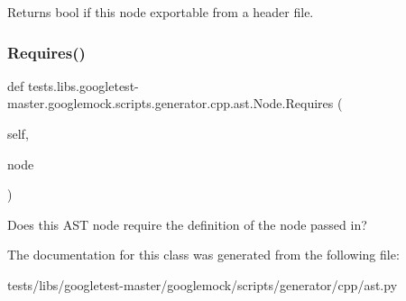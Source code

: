 \begin{DoxyVerb}Returns bool if this node exportable from a header file.\end{DoxyVerb}
 \mbox{\label{classtests_1_1libs_1_1googletest-master_1_1googlemock_1_1scripts_1_1generator_1_1cpp_1_1ast_1_1Node_a51850f66022797037de27b805c5a6454}} 
\subsubsection{\texorpdfstring{Requires()}{Requires()}}
{\footnotesize\ttfamily def tests.\+libs.\+googletest-\/master.\+googlemock.\+scripts.\+generator.\+cpp.\+ast.\+Node.\+Requires (\begin{DoxyParamCaption}\item[{}]{self,  }\item[{}]{node }\end{DoxyParamCaption})}

\begin{DoxyVerb}Does this AST node require the definition of the node passed in?\end{DoxyVerb}
 

The documentation for this class was generated from the following file\+:\begin{DoxyCompactItemize}
\item 
tests/libs/googletest-\/master/googlemock/scripts/generator/cpp/ast.\+py\end{DoxyCompactItemize}
